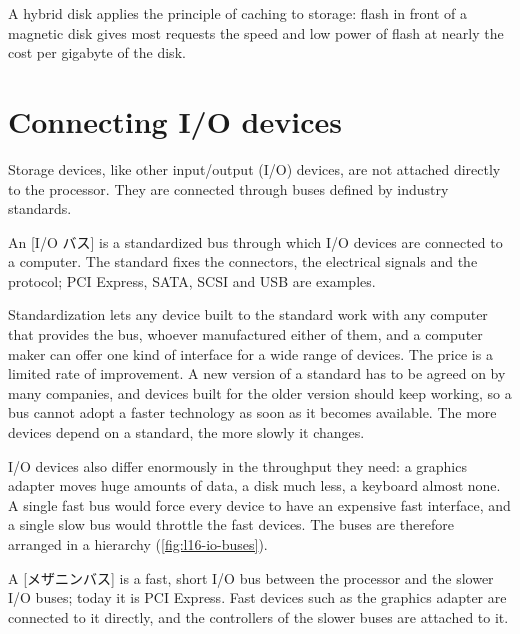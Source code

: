 \documentclass[../main.tex]{subfiles}
\begin{document}
\begin{keypoint}
  A hybrid disk applies the principle of caching to storage: flash in front
  of a magnetic disk gives most requests the speed and low power of flash at
  nearly the cost per gigabyte of the disk.
\end{keypoint}

\section{Connecting I/O devices}
\label{sec:l16-io}

Storage devices, like other input/output (I/O) devices, are not attached
directly to the processor.  They are
connected through buses defined by industry standards.

\begin{definition}[I/O bus]
  An [I/O バス] is a standardized bus through which I/O
  devices are connected to a computer.  The standard fixes the connectors,
  the electrical signals and the protocol; PCI Express, SATA, SCSI and USB
  are examples.
\end{definition}

Standardization lets any device built to the standard work with any computer
that provides the bus, whoever manufactured either of them, and a computer
maker can offer one kind of interface for a wide range of devices.  The
price is a limited rate of improvement.  A new version of a standard has to
be agreed on by many companies, and devices built for the older version
should keep working, so a bus cannot adopt a faster technology as soon as it
becomes available.  The more devices depend on a standard, the more slowly
it changes.

I/O devices also differ enormously in the throughput they need: a graphics
adapter moves huge amounts of data, a disk much less, a keyboard almost none.
A single fast bus would force every device to have an expensive fast
interface, and a single slow bus would throttle the fast devices.  The buses
are therefore arranged in a hierarchy (\cref{fig:l16-io-buses}).

\begin{definition}
  A [メザニンバス] is a fast, short I/O bus between the
  processor and the slower I/O buses; today it is PCI Express.  Fast devices
  such as the graphics adapter are connected to it directly, and the
  controllers of the slower buses are attached to it.
\end{definition}
\end{document}
